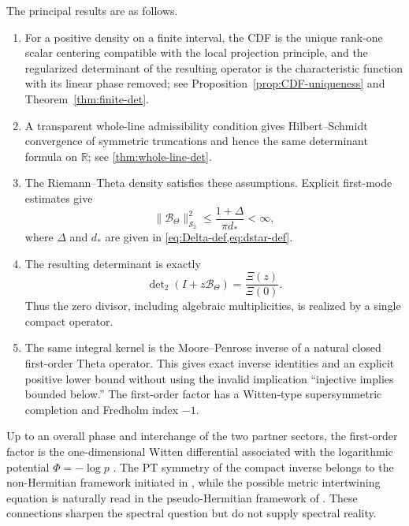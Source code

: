 \documentclass[11pt,reqno]{amsart}
\numberwithin{equation}{section}
\newcommand{\R}{\mathbb R}
\newcommand{\1}{\mathbf 1}
\newcommand{\HS}{\mathcal S_2}
\newcommand{\BTheta}{\mathcal B_{\Theta}}
\newcommand{\detTwo}{\det\nolimits_{2}}
\begin{document}
The principal results are as follows.
\begin{enumerate}[label=(\roman*),leftmargin=2.3em]
 \item For a positive density on a finite interval, the CDF is the unique
 rank-one scalar centering compatible with the local projection principle,
 and the regularized determinant of the resulting operator is the
 characteristic function with its linear phase removed; see
 Proposition~\ref{prop:CDF-uniqueness} and
 Theorem~\ref{thm:finite-det}.
 \item A transparent whole-line admissibility condition gives
 Hilbert--Schmidt convergence of symmetric truncations and hence the same
 determinant formula on $\R$; see \cref{thm:whole-line-det}.
 \item The Riemann--Theta density satisfies these assumptions.  Explicit
 first-mode estimates give
 \begin{equation}\label{eq:intro-hs-bound}
  \|\BTheta\|_{\HS}^2
  \leq \frac{1+\Delta}{\pi d_*}<\infty,
 \end{equation}
 where $\Delta$ and $d_*$ are given in \cref{eq:Delta-def,eq:dstar-def}.
 \item The resulting determinant is exactly
 \begin{equation}\label{eq:intro-main-det}
  \detTwo(I+z\BTheta)=\frac{\Xi(z)}{\Xi(0)}.
 \end{equation}
 Thus the zero divisor, including algebraic multiplicities, is realized by a
 single compact operator.
 \item The same integral kernel is the Moore--Penrose inverse of a natural
 closed first-order Theta operator.  This gives exact inverse identities and
 an explicit positive lower bound without using the invalid implication
 ``injective implies bounded below.''  The first-order factor has a
 Witten-type supersymmetric completion and Fredholm index $-1$.
\end{enumerate}

Up to an overall phase and interchange of the two partner sectors, the
first-order factor is the one-dimensional Witten differential associated
with the logarithmic potential $\Phi=-\log p$ \cite{Witten1982}.  The
PT symmetry of the compact inverse belongs to the non-Hermitian framework
initiated in \cite{BenderBoettcher1998}, while the possible metric
intertwining equation is naturally read in the pseudo-Hermitian framework of
\cite{Mostafazadeh2002,Mostafazadeh2002III}.  These connections sharpen the
spectral question but do not supply spectral reality.
\end{document}
